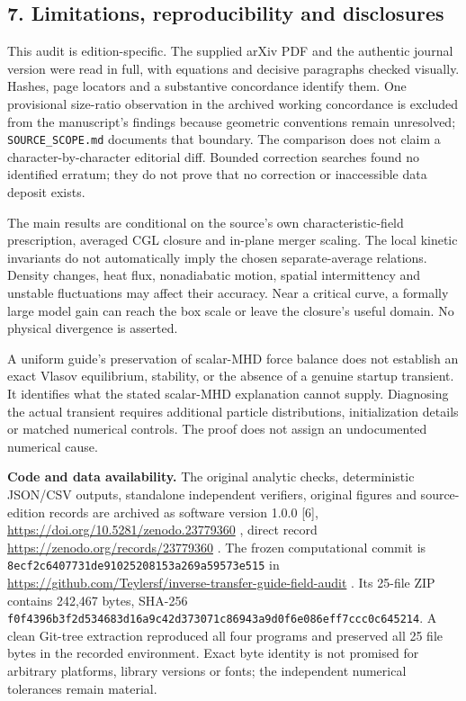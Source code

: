 \subsection{7. Limitations, reproducibility and
disclosures}\label{limitations-reproducibility-and-disclosures}

This audit is edition-specific. The supplied arXiv PDF and the authentic
journal version were read in full, with equations and decisive
paragraphs checked visually. Hashes, page locators and a substantive
concordance identify them. One provisional size-ratio observation in the
archived working concordance is excluded from the manuscript's findings
because geometric conventions remain unresolved;
\nolinkurl{SOURCE_SCOPE.md} documents that boundary. The comparison does
not claim a character-by-character editorial diff. Bounded correction
searches found no identified erratum; they do not prove that no
correction or inaccessible data deposit exists.

The main results are conditional on the source's own
characteristic-field prescription, averaged CGL closure and in-plane
merger scaling. The local kinetic invariants do not automatically imply
the chosen separate-average relations. Density changes, heat flux,
nonadiabatic motion, spatial intermittency and unstable fluctuations may
affect their accuracy. Near a critical curve, a formally large model
gain can reach the box scale or leave the closure's useful domain. No
physical divergence is asserted.

A uniform guide's preservation of scalar-MHD force balance does not
establish an exact Vlasov equilibrium, stability, or the absence of a
genuine startup transient. It identifies what the stated scalar-MHD
explanation cannot supply. Diagnosing the actual transient requires
additional particle distributions, initialization details or matched
numerical controls. The proof does not assign an undocumented numerical
cause.

\textbf{Code and data availability.} The original analytic checks,
deterministic JSON/CSV outputs, standalone independent verifiers,
original figures and source-edition records are archived as software
version 1.0.0 {[}6{]}, \url{https://doi.org/10.5281/zenodo.23779360} ,
direct record \url{https://zenodo.org/records/23779360} . The frozen
computational commit is
\nolinkurl{8ecf2c6407731de91025208153a269a59573e515} in
\url{https://github.com/Teylersf/inverse-transfer-guide-field-audit} .
Its 25-file ZIP contains 242,467 bytes, SHA-256
\nolinkurl{f0f4396b3f2d534683d16a9c42d373071c86943a9d0f6e086eff7ccc0c645214}.
A clean Git-tree extraction reproduced all four programs and preserved
all 25 file bytes in the recorded environment. Exact byte identity is
not promised for arbitrary platforms, library versions or fonts; the
independent numerical tolerances remain material.

